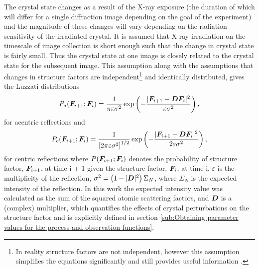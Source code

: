 The crystal state changes as a result of the X-ray exposure (the duration of which will differ for a single diffraction image depending on the goal of the experiment) and the magnitude of these changes will vary depending on the radiation sensitivity of the irradiated crystal.
It is assumed that X-ray irradiation on the timescale of image collection is short enough such that the change in crystal state is fairly small.
Thus the crystal state at one image is closely related to the crystal state for the subsequent image.
This assumption along with the assumptions that changes in structure factors are independent\footnote{In reality structure factors are not independent, however this assumption simplifies the equations significantly and still provides useful information \cite{pannu1996improved}.} and identically distributed, gives the Luzzati distributions \cite{luzzati1952traitement,read1990structure,pannu1996improved}
\begin{equation}
    P_a(\boldsymbol{F}_{i+1} ; \boldsymbol{F}_i) = \frac{1}{\pi \varepsilon \sigma^2} \exp \left(-\frac{|\boldsymbol{F}_{i+1} - \boldsymbol{D}\boldsymbol{F}_i|^2}{\varepsilon \sigma^2}\right),
    \label{eq:Luzzati distribution for acentric reflections}
\end{equation}
for acentric reflections and
\begin{equation}
    P_c(\boldsymbol{F}_{i+1} ; \boldsymbol{F}_i) = \frac{1}{\left[ 2 \pi \varepsilon \sigma^2 \right]^{1/2}} \exp \left(-\frac{|\boldsymbol{F}_{i+1} - \boldsymbol{D}\boldsymbol{F}_i|^2}{2 \varepsilon \sigma^2}\right),
    \label{eq:Luzzati distribution for centric reflections}
\end{equation}
for centric reflections where $P(\boldsymbol{F}_{i+1} ; \boldsymbol{F}_i)$ denotes the probability of structure factor, $\boldsymbol{F}_{i+1}$, at time i + 1 given the structure factor, $\boldsymbol{F}_{i}$, at time i, $\varepsilon$ is the multiplicity of the reflection, $\sigma^2 = \left(1 - |\boldsymbol{D}|^2 \right)\Sigma_N$, where $\Sigma_N$ is the expected intensity of the reflection.
In this work the expected intensity value was calculated as the sum of the squared atomic scattering factors, and $\boldsymbol{D}$ is a (complex) multiplier, which quantifies the effects of crystal perturbations on the structure factor and is  explicitly defined in section \ref{sub:Obtaining parameter values for the process and observation functions}.

